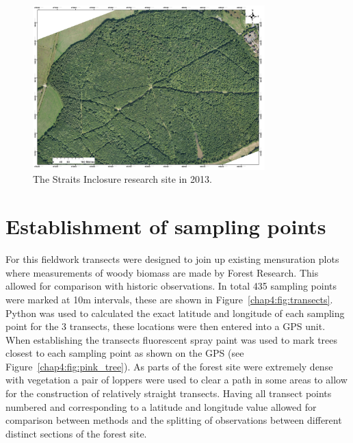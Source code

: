 \begin{figure}[ht]
    \centering
    \includegraphics[width=0.8\textwidth]{chapter/chapter4/AP1_2013.jpg}
    \caption{The Straits Inclosure research site in 2013.} \label{chap4:fig:ah_aerial_photo}
\end{figure}

\section{Establishment of sampling points}

For this fieldwork transects were designed to join up existing mensuration plots where measurements of woody biomass are made by Forest Research. This allowed for comparison with historic observations. In total 435 sampling points were marked at 10m intervals, these are shown in Figure~\ref{chap4:fig:transects}. Python was used to calculated the exact latitude and longitude of each sampling point for the 3 transects, these locations were then entered into a GPS unit. When establishing the transects fluorescent spray paint was used to mark trees closest to each sampling point as shown on the GPS (see Figure~\ref{chap4:fig:pink_tree}). As parts of the forest site were extremely dense with vegetation a pair of loppers were used to clear a path in some areas to allow for the construction of relatively straight transects. Having all transect points numbered and corresponding to a latitude and longitude value allowed for comparison between methods and the splitting of observations between different distinct sections of the forest site. 


